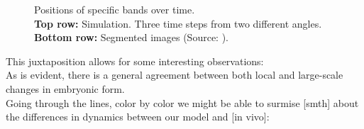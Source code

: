 \begin{figure}[H]
    \centering
\end{figure}
\begin{figure}[H]
    \centering
    \caption{Positions of specific bands over time. \\ \textbf{Top row:} Simulation. Three time steps from two different angles.\\ \textbf{Bottom row:}  Segmented images (Source: ). \\}
    \label{fig:band-movements-stas}
\end{figure}

This juxtaposition allows for some interesting observations:\\
As is evident, there is a general agreement between both local and large-scale changes in embryonic form. \\

Going through the lines, color by color we might be able to surmise [smth] about the differences in dynamics between our model and [in vivo]:

